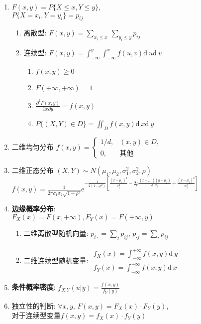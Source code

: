 \documentclass[10pt,a4paper,nofonts]{ctexart}
\newcommand{\D}{\displaystyle}
\renewcommand{\d}{{\mathrm{d}\:\!}}
\newcommand{\e}{{\mathrm{e}}}
\begin{document}
\begin{multicols}{2}
\begin{enumerate}
\item $F(x,y)=P\{X\le x,Y\le y\}$,\\$P\{X=x_i,Y=y_i\}=p_{ij}$
\begin{enumerate}
\item 离散型: $F(x,y)=\sum_{x_i\le x}\,\sum_{y_i\le y}p_{ij}$
\item 连续型: $F(x,y)=\int_{-\infty}^{y}\int_{-\infty}^{x}f(u,v)\d u\d v$
\begin{enumerate}
\item $f(x,y)\ge 0$
\item $F(+\infty,+\infty)=1$
\item $\D\frac{\partial^2 F(x,y)}{\partial x \partial y}=f(x,y)$
\item $P\{(X,Y)\in D\}=\iint_D f(x,y)\d x\d y$
\end{enumerate}
\end{enumerate}
\item 二维均匀分布
$f(x,y)=\left\{\begin{array}{cl}
{1}/{d}, & (x,y)\in D,\\
0, & \text{其他}
\end{array}\right.$
\item 二维正态分布 $(X,Y)\sim N(\mu_1,\mu_2,\sigma_1^2,\sigma_2^2,\rho)$\\
$\D f(x,y)=\frac{1}{2\pi\sigma_1\sigma_2\sqrt{1-\rho^2}}\e^{-\frac{1}{2(1-\rho^2)}\left[\frac{(x-\mu_1)^2}{\sigma_1^2}-2\rho\frac{(x-\mu_1)(y-\mu_2)}{\sigma_1\sigma_2}+\frac{(y-\mu_2)^2}{\sigma_2^2}\right]}$
\item {\bf 边缘概率分布}:\\$F_X(x)=F(x,+\infty), F_Y(x)=F(+\infty,y)$
\begin{enumerate}
\item 二维离散型随机向量: $p_{i\cdot}=\sum_j p_{ij}$, $p_{\cdot j}=\sum_i p_{ij}$
\item 二维连续型随机变量: $\begin{array}{l}
f_X(x)=\int_{-\infty}^{+\infty}f(x,y)\d y\\
f_Y(x)=\int_{-\infty}^{+\infty}f(x,y)\d x
\end{array}$
\end{enumerate}
\item {\bf 条件概率密度}: $f_{X|Y}(u|y)=\D\frac{f(x,y)}{f_Y(y)}$
\item 独立性的判断: $\forall x,y$, $F(x,y)=F_X(x)\cdot F_Y(y)$, \\对于连续型变量$f(x,y)=f_X(x)\cdot f_Y(y)$


\end{enumerate}
\end{multicols}
\end{document}
